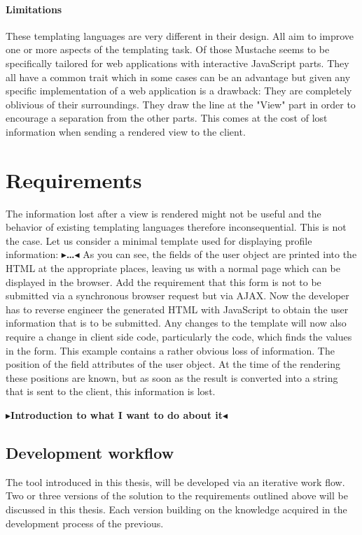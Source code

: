 \documentclass[twoside,11pt,openright]{report}
\newcommand{\todo}[1]{{\color[rgb]{.5,0,0}\textbf{$\blacktriangleright$#1$\blacktriangleleft$}}}
\begin{document}
\subsubsection{Limitations}
These templating languages are very different in their design.
All aim to improve one or more aspects of the templating task.
Of those Mustache seems to be specifically tailored for web applications
with interactive JavaScript parts.
They all have a common trait which in some cases can be an advantage
but given any specific implementation of a web application is a drawback:
They are completely oblivious of their surroundings. They draw the line
at the "View" part in order to encourage a separation from the other
parts. This comes at the cost of lost information when sending a
rendered view to the client.


\chapter{Requirements}
The information lost after a view is rendered might not be useful and
the behavior of existing templating languages therefore inconsequential.
This is not the case. Let us consider a minimal template used for
displaying profile information:
\todo{\dots}
As you can see, the fields of the user object are printed into the HTML
at the appropriate places, leaving us with a normal page which can be
displayed in the browser.
Add the requirement that this form is not to be submitted via a
synchronous browser request but via AJAX. Now the developer has to
reverse engineer the generated HTML with JavaScript to obtain the
user information that is to be submitted. Any changes to the template
will now also require a change in client side code, particularly the
code, which finds the values in the form.
This example contains a rather obvious loss of information.
The position of the field attributes of the user object.
At the time of the rendering these positions are known, but as soon as the
result is converted into a string that is sent to the client, this
information is lost.

\todo{Introduction to what I want to do about it}

\section{Development workflow}
The tool introduced in this thesis, will be developed via an iterative
work flow. Two or three versions of the solution to the requirements outlined
above will be discussed in this thesis. Each version building on the knowledge
acquired in the development process of the previous.
\end{document}

